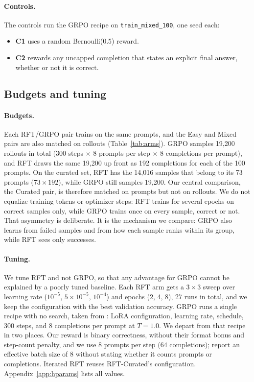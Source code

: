 \documentclass{article}
\begin{document}
\paragraph{Controls.} The controls run the GRPO recipe on \texttt{train\_mixed\_100}, one seed each:
\begin{itemize}
  \item \textbf{C1} uses a random Bernoulli(0.5) reward.
  \item \textbf{C2} rewards any uncapped completion that states an explicit final answer, whether or not it is correct.
\end{itemize}

\subsection{Budgets and tuning}
\label{sec:budgets}

\paragraph{Budgets.} Each RFT/GRPO pair trains on the same prompts, and the Easy and Mixed pairs are also matched on rollouts (Table~\ref{tab:arms}). GRPO samples 19{,}200 rollouts in total (300 steps $\times$ 8 prompts per step $\times$ 8 completions per prompt), and RFT draws the same 19{,}200 up front as 192 completions for each of the 100 prompts. On the curated set, RFT has the 14{,}016 samples that belong to its 73 prompts ($73 \times 192$), while GRPO still samples 19{,}200. Our central comparison, the Curated pair, is therefore matched on prompts but not on rollouts. We do not equalize training tokens or optimizer steps: RFT trains for several epochs on correct samples only, while GRPO trains once on every sample, correct or not. That asymmetry is deliberate. It is the mechanism we compare: GRPO also learns from failed samples and from how each sample ranks within its group, while RFT sees only successes.

\paragraph{Tuning.} We tune RFT and not GRPO, so that any advantage for GRPO cannot be explained by a poorly tuned baseline. Each RFT arm gets a $3{\times}3$ sweep over learning rate ($10^{-5}$, $5{\times}10^{-5}$, $10^{-4}$) and epochs (2, 4, 8), 27 runs in total, and we keep the configuration with the best validation accuracy. GRPO runs a single recipe with no search, taken from \citet{bauer2026}: LoRA configuration, learning rate, schedule, 300 steps, and 8 completions per prompt at $T{=}1.0$. We depart from that recipe in two places. Our reward is binary correctness, without their format bonus and step-count penalty, and we use 8 prompts per step (64 completions); \citet{bauer2026} report an effective batch size of 8 without stating whether it counts prompts or completions. Iterated RFT reuses RFT-Curated's configuration. Appendix~\ref{app:hparams} lists all values.
\end{document}

